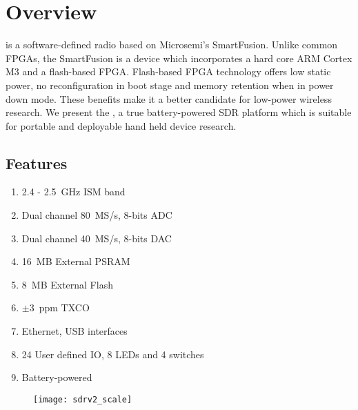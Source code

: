\chapter{Overview}
\sdr is a software-defined radio based on Microsemi's SmartFusion. Unlike common FPGAs, the SmartFusion
is a device which incorporates a hard core ARM Cortex M3 and a flash-based FPGA. Flash-based FPGA
technology offers low static power, no reconfiguration in boot stage and memory retention when in
power down mode. These benefits make it a better candidate for low-power wireless research. We present
the \sdr, a true battery-powered SDR platform which is suitable for portable and deployable hand held
device research.
\section{Features}
\begin{enumerate}
	\item 2.4 - 2.5~GHz ISM band
	\item Dual channel 80~MS/s, 8-bits ADC
	\item Dual channel 40~MS/s, 8-bits DAC
	\item 16~MB External PSRAM
	\item 8~MB External Flash
	\item $\pm$3~ppm TXCO
	\item Ethernet, USB interfaces
	\item 24 User defined IO, 8 LEDs and 4 switches
	\item Battery-powered
\end{enumerate}

\begin{figure}[h]
\centering
	\texttt{[image: sdrv2\_scale]}
\end{figure}
